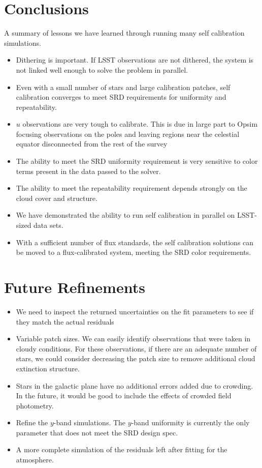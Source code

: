 \documentclass[12pt,preprint]{aastex}
\begin{document}
\section{Conclusions}
A summary of lessons we have learned through running many self calibration simulations.
\begin{itemize}
\item{Dithering is important.  If LSST observations are not dithered, the system is not linked well enough to solve the problem in parallel.}
\item{Even with a small number of stars and large calibration patches, self calibration converges to meet SRD requirements for uniformity and repeatability.}
\item{$u$ observations are very tough to calibrate.  This is due in large part to Opsim focusing observations on the poles and leaving regions near the celestial equator disconnected from the rest of the survey}
\item{The ability to meet the SRD uniformity requirement is very sensitive to color terms present in the data passed to the solver.}
\item{The ability to meet the repeatability requirement depends strongly on the cloud cover and structure.  }
\item{We have demonstrated the ability to run self calibration in parallel on LSST-sized data sets.}
\item{With a sufficient number of flux standards, the self calibration solutions can be moved to a flux-calibrated system, meeting the SRD color requirements.}
\end{itemize}


\section{Future Refinements}
\begin{itemize}
\item{We need to inspect the returned uncertainties on the fit parameters to see if they match the actual residuals}
\item{Variable patch sizes.  We can easily identify observations that were taken in cloudy conditions.  For these observations, if there are an adequate number of stars, we could consider decreasing the patch size to remove additional cloud extinction structure.}
\item{Stars in the galactic plane have no additional errors added due to crowding.  In the future, it would be good to include the effects of crowded field photometry.  }
\item{Refine the $y$-band simulations.  The $y$-band uniformity is currently the only parameter that does not meet the SRD design spec.}
\item{A more complete simulation of the residuals left after fitting for the atmosphere.}
\end{itemize}



\end{document}

